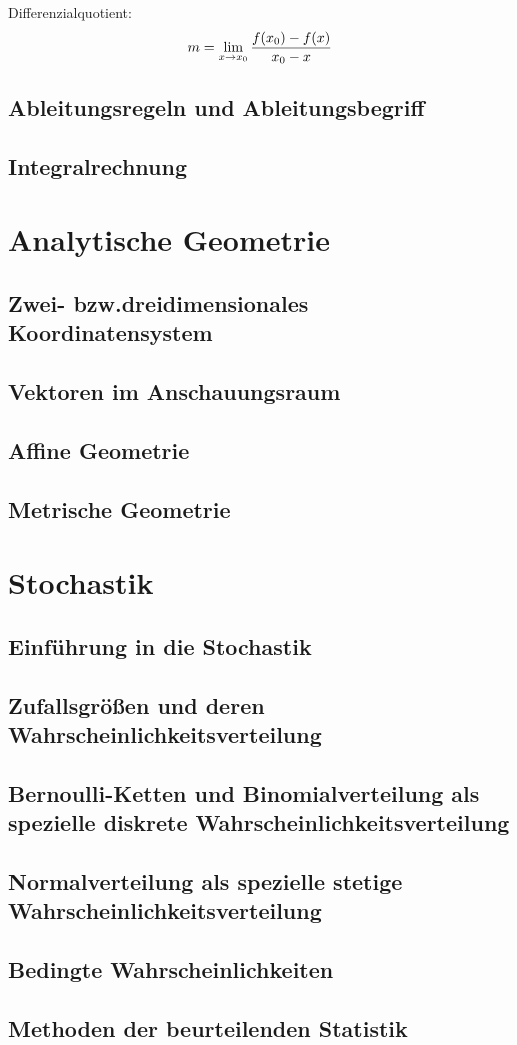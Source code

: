 \documentclass{article}
\begin{document}
Differenzialquotient:
\[
    m = \lim_{x \to x_{0}} {{f(x_{0}) - f(x)} \over { x_{0} - x}}
\]



\paragraph{}

\subsection{Ableitungsregeln und Ableitungsbegriff}
\subsection{Integralrechnung}

\section{Analytische Geometrie}
\subsection{Zwei- bzw.dreidimensionales Koordinatensystem}
\subsection{Vektoren im Anschauungsraum}
\subsection{Affine Geometrie}
\subsection{Metrische Geometrie}

\section{Stochastik}
\subsection{Einführung in die Stochastik}
\subsection{Zufallsgrößen und deren Wahrscheinlichkeitsverteilung}
\subsection{Bernoulli-Ketten und Binomialverteilung als spezielle diskrete Wahrscheinlichkeitsverteilung}
\subsection{Normalverteilung als spezielle stetige Wahrscheinlichkeitsverteilung}
\subsection{Bedingte Wahrscheinlichkeiten}
\subsection{Methoden der beurteilenden Statistik}
\end{document}
